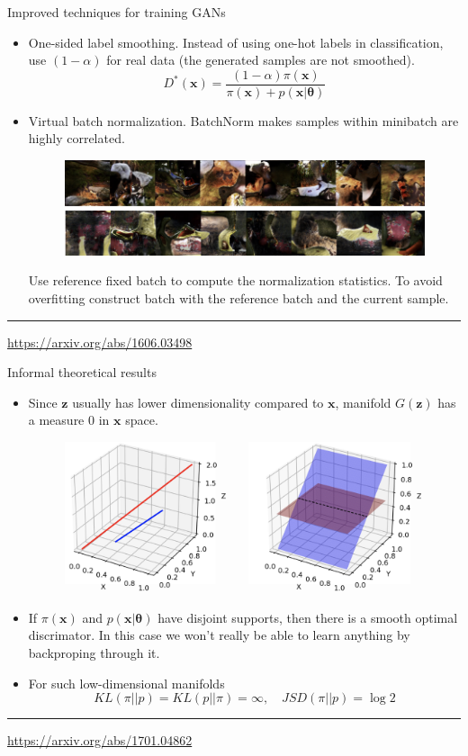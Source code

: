 \documentclass{beamer}
\newcommand{\bx}{\mathbf{x}}
\newcommand{\bz}{\mathbf{z}}
\newcommand{\btheta}{\boldsymbol{\theta}}
\begin{document}
\begin{frame}{Improved techniques for training GANs}
	\begin{itemize}
		\item One-sided label smoothing. Instead of using one-hot labels in classification, use $(1 - \alpha)$ for real data (the generated samples are not smoothed).
		\[
			D^*(\bx) = \frac{(1 - \alpha )\pi(\bx)}{\pi(\bx) + p(\bx | \btheta)}
		\]
		\item Virtual batch normalization. BatchNorm makes samples within minibatch are highly correlated.
		\begin{figure}
			\centering
			\includegraphics[width=0.6\linewidth]{figs/virtual_batch_norm}
		\end{figure}
	Use reference fixed batch to compute the normalization statistics. To avoid overfitting construct batch with the reference batch and the current sample. 
	\end{itemize}
	\vfill
	\hrule\medskip
	{\scriptsize \href{https://arxiv.org/abs/1606.03498}{https://arxiv.org/abs/1606.03498}}
\end{frame}
\begin{frame}{Informal theoretical results}
	\begin{itemize}
		\item Since $\bz$ usually has lower dimensionality compared to $\bx$, manifold $G(\bz)$ has a measure 0 in $\bx$ space.
		\begin{figure}
			\centering
			\includegraphics[width=0.6\linewidth]{figs/low_dim_manifold}
		\end{figure}
		\item If $\pi(\bx)$ and $p(\bx | \btheta)$ have disjoint supports, then there is a smooth optimal discrimator. In this case we won’t really be able to learn anything by backproping through it.
		\item For such low-dimensional manifolds
		\[
			KL(\pi || p) = KL(p || \pi) = \infty, \quad JSD(\pi || p) = \log 2
		\]
	\end{itemize}
	\vfill
	\hrule\medskip
	{\scriptsize \href{https://arxiv.org/abs/1701.04862}{https://arxiv.org/abs/1701.04862}}
\end{frame}
\end{document}
